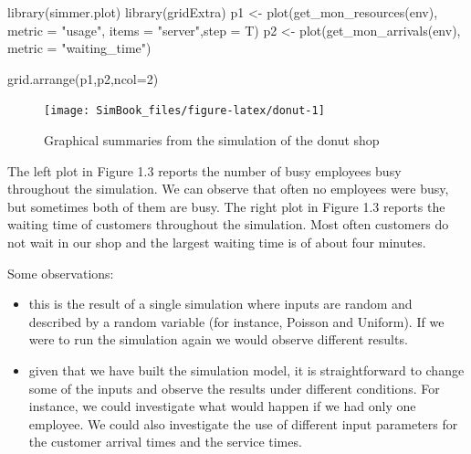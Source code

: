 \documentclass[
]{book}
\newenvironment{Shaded}{\begin{snugshade}}{\end{snugshade}}
\newcommand{\AttributeTok}[1]{\textcolor[rgb]{0.77,0.63,0.00}{#1}}
\newcommand{\DecValTok}[1]{\textcolor[rgb]{0.00,0.00,0.81}{#1}}
\newcommand{\FunctionTok}[1]{\textcolor[rgb]{0.00,0.00,0.00}{#1}}
\newcommand{\NormalTok}[1]{#1}
\newcommand{\OtherTok}[1]{\textcolor[rgb]{0.56,0.35,0.01}{#1}}
\newcommand{\StringTok}[1]{\textcolor[rgb]{0.31,0.60,0.02}{#1}}
\begin{document}
\begin{Shaded}
\begin{Highlighting}[]
\FunctionTok{library}\NormalTok{(simmer.plot)}
\FunctionTok{library}\NormalTok{(gridExtra)}
\NormalTok{p1 }\OtherTok{\textless{}{-}} \FunctionTok{plot}\NormalTok{(}\FunctionTok{get\_mon\_resources}\NormalTok{(env), }\AttributeTok{metric =} \StringTok{"usage"}\NormalTok{, }\AttributeTok{items =} \StringTok{"server"}\NormalTok{,}\AttributeTok{step =}\NormalTok{ T)}
\NormalTok{p2 }\OtherTok{\textless{}{-}} \FunctionTok{plot}\NormalTok{(}\FunctionTok{get\_mon\_arrivals}\NormalTok{(env), }\AttributeTok{metric =} \StringTok{"waiting\_time"}\NormalTok{)}

\FunctionTok{grid.arrange}\NormalTok{(p1,p2,}\AttributeTok{ncol=}\DecValTok{2}\NormalTok{)}
\end{Highlighting}
\end{Shaded}

\begin{figure}

{\centering \texttt{[image: SimBook\_files/figure-latex/donut-1]} 

}

\caption{Graphical summaries from the simulation of the donut shop}\label{fig:donut}
\end{figure}

The left plot in Figure 1.3 reports the number of busy employees busy throughout the simulation. We can observe that often no employees were busy, but sometimes both of them are busy. The right plot in Figure 1.3 reports the waiting time of customers throughout the simulation. Most often customers do not wait in our shop and the largest waiting time is of about four minutes.

Some observations:

\begin{itemize}
\item
  this is the result of a single simulation where inputs are random and described by a random variable (for instance, Poisson and Uniform). If we were to run the simulation again we would observe different results.
\item
  given that we have built the simulation model, it is straightforward to change some of the inputs and observe the results under different conditions. For instance, we could investigate what would happen if we had only one employee. We could also investigate the use of different input parameters for the customer arrival times and the service times.
\end{itemize}
\end{document}
